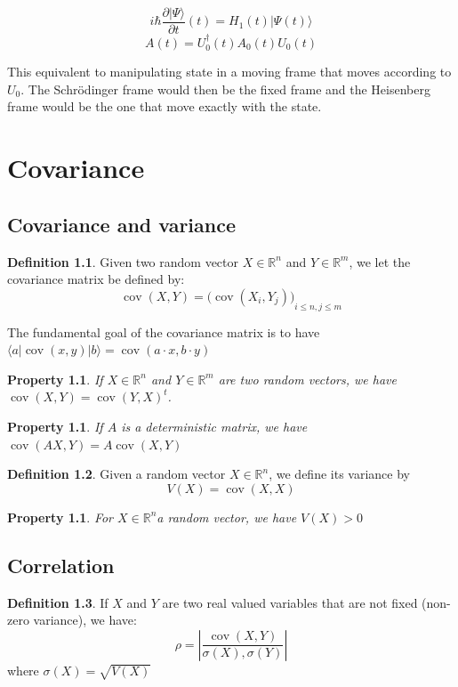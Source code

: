 \documentclass[10pt,a4paper]{report}
\theoremstyle{plain}
\newtheorem{prop}[thm]{Property}
\theoremstyle{definition}
\newtheorem{defn}{Definition}[chapter]
\theoremstyle{remark}
\newcommand{\R}{\ensuremath{\mathbb{R}}}
\newcommand{\ket}[1]{|#1\rangle}
\newcommand{\bra}[1]{\langle#1|}
\renewcommand{\leq}{\leqslant}
\DeclareMathOperator{\cov}{cov}
\begin{document}
\[i\hbar \frac{\partial \ket \Psi}{\partial t} (t) = H_1(t) \ket {\Psi(t)} \]
\[A(t) = U_0^\dagger(t)A_0(t)U_0(t)\]

This equivalent to manipulating state in a moving frame that moves according to
$U_0$. The Schrödinger frame would then be the fixed frame and the Heisenberg frame
would be the one that move exactly with the state.

\chapter{Covariance}\label{app:cov}

\section{Covariance and variance}

\begin{defn}
  Given two random vector $X \in \R^n$ and $Y \in \R^m$, we let the covariance
  matrix be defined by:
  \[\cov(X,Y) = {\big(\cov(X_i,Y_j)\big)}_{i \leq n, j \leq m}\]
\end{defn}

The fundamental goal of the covariance matrix is to have $\bra a \cov(x,y) \ket
b = \cov(a \cdot x, b \cdot y)$
\begin{prop} If $X \in \R^n$ and $Y \in \R^m$ are two random vectors, we have $\cov(X,Y) = {\cov(Y,X)}^t$.
\end{prop}
\begin{prop} If $A$ is a deterministic matrix, we have $ \cov(A X, Y) = A \cov(X,Y)$
\end{prop}

\begin{defn}
  Given a random vector $X \in \R^n$, we define its variance by
  \[V(X) = \cov(X,X)\]
\end{defn}

\begin{prop} For $X \in \R^n$a random vector, we have $V(X) > 0$
\end{prop}

\section{Correlation}\label{sec:correl}

\begin{defn}
  If $X$ and $Y$ are two real valued variables that are not fixed (non-zero
  variance), we have:
  \[\rho = \left|\frac {\cov(X,Y)}{\sigma(X),\sigma(Y)}\right|\]
  where $\sigma(X) = \sqrt{V(X)}$
\end{defn}
\end{document}
